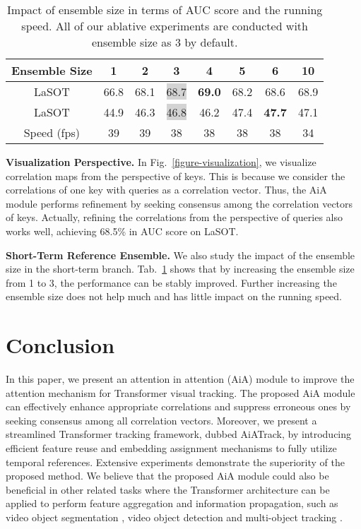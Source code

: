 \documentclass[runningheads]{llncs}
\begin{document}
\begin{table}[t]
\centering
\begin{tabular}{c|ccccccc}
\hline
Ensemble Size & 1 & 2 & 3 & 4 & 5 & 6 & 10 \\
\hline
LaSOT \cite{fan2019lasot} & 66.8 & 68.1 & \colorbox{lightgray}{68.7} & \textbf{69.0} & 68.2 & 68.6 & 68.9 \\
LaSOT \cite{fan2021lasot} & 44.9 & 46.3 & \colorbox{lightgray}{46.8} & 46.2 & 47.4 & \textbf{47.7} & 47.1 \\
\hline
Speed (fps) & 39 & 39 & 38 & 38 & 38 & 38 & 34 \\
\hline
\end{tabular}
\caption{Impact of ensemble size in terms of AUC score and the running speed. All of our ablative experiments are conducted with ensemble size as 3 by default.}
\label{table-sensitivity}
\end{table}

\noindent\textbf{Visualization Perspective.} In Fig.~\ref{figure-visualization}, we visualize correlation maps from the perspective of keys. This is because we consider the correlations of one key with queries as a correlation vector. Thus, the AiA module performs refinement by seeking consensus among the correlation vectors of keys. Actually, refining the correlations from the perspective of queries also works well, achieving 68.5\% in AUC score on LaSOT.

\noindent\textbf{Short-Term Reference Ensemble.} We also study the impact of the ensemble size in the short-term branch. Tab.~\ref{table-sensitivity} shows that by increasing the ensemble size from 1 to 3, the performance can be stably improved. Further increasing the ensemble size does not help much and has little impact on the running speed.

\section{Conclusion}
In this paper, we present an attention in attention (AiA) module to improve the attention mechanism for Transformer visual tracking. The proposed AiA module can effectively enhance appropriate correlations and suppress erroneous ones by seeking consensus among all correlation vectors. Moreover, we present a streamlined Transformer tracking framework, dubbed AiATrack, by introducing efficient feature reuse and embedding assignment mechanisms to fully utilize temporal references. Extensive experiments demonstrate the superiority of the proposed method. We believe that the proposed AiA module could also be beneficial in other related tasks where the Transformer architecture can be applied to perform feature aggregation and information propagation, such as video object segmentation \cite{yang2021associating,lan2021siamese,duke2021sstvos,mao2021joint}, video object detection \cite{he2021end} and multi-object tracking \cite{sun2020transtrack,meinhardt2021trackformer,zhang2021bytetrack}. \\
\end{document}
